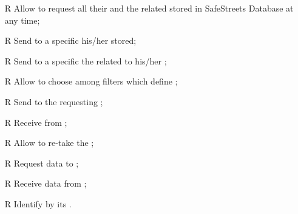 \documentclass[../../../RASD.tex]{subfiles}
\begin{document}
\begin{itemize}
	\item[R\subs{20}]Allow  to request all their  and the related  stored in SafeStreets Database at any time;
	\item[R\subs{21}]Send to a specific  his/her  stored;
	\item[R\subs{22}]Send to a specific  the  related to his/her ;
	\item[R\subs{23}]Allow  to choose among filters which define ;
	\item[R\subs{24}]Send  to the requesting ;
	\item[R\subs{25}]Receive  from ;
	\item[R\subs{26}]Allow  to re-take the ;
	\item[R\subs{27}]Request  data to ;
	\item[R\subs{28}]Receive  data from ;
	\item[R\subs{29}]Identify  by its .

	
\end{itemize}
\end{document}
